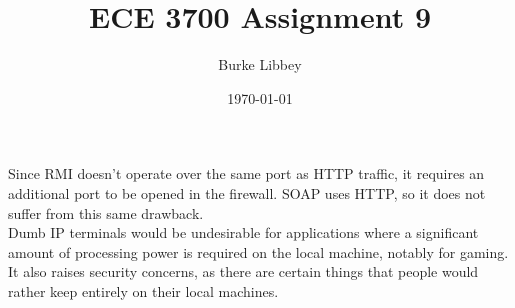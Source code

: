 \documentclass[10pt,letterpaper]{article}
\begin{document}
\author{Burke Libbey}
\date{\today}
\title{ECE 3700 Assignment 9}
\maketitle

\noindent Since RMI doesn't operate over the same port as HTTP traffic, it requires an additional port to be opened in the firewall. SOAP uses HTTP, so it does not suffer from this same drawback.
\\

\noindent Dumb IP terminals would be undesirable for applications where a significant amount of processing power is required on the local machine, notably for gaming. It also raises security concerns, as there are certain things that people would rather keep entirely on their local machines. 
\end{document}
